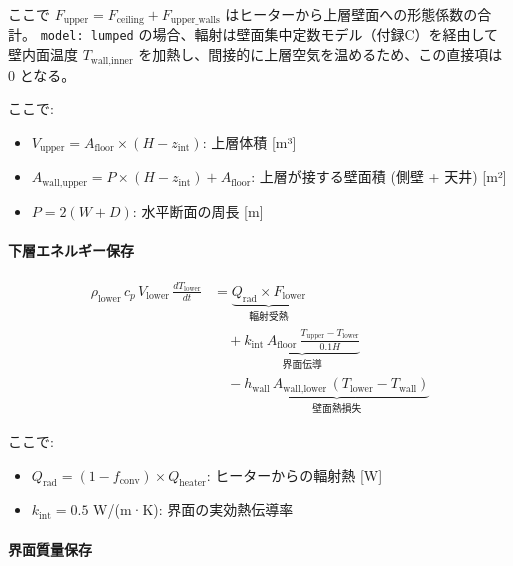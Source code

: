 \documentclass[a4paper,11pt]{article}
\begin{document}
ここで $F_{\text{upper}} = F_{\text{ceiling}} + F_{\text{upper\_walls}}$ はヒーターから上層壁面への形態係数の合計。
\texttt{model: lumped} の場合、輻射は壁面集中定数モデル（付録C）を経由して
壁内面温度 $T_{\text{wall,inner}}$ を加熱し、間接的に上層空気を温めるため、この直接項は 0 となる。

ここで:

\begin{itemize} \item $V_{\text{upper}} = A_{\text{floor}} \times (H - z_{\text{int}})$: 上層体積 [m³] \end{itemize}
\begin{itemize} \item $A_{\text{wall,upper}} = P \times (H - z_{\text{int}}) + A_{\text{floor}}$: 上層が接する壁面積 (側壁 + 天井) [m²] \end{itemize}
\begin{itemize} \item $P = 2(W + D)$: 水平断面の周長 [m] \end{itemize}

\paragraph{下層エネルギー保存}

\begin{align*}
\rho_{\text{lower}} \, c_p \, V_{\text{lower}} \, \frac{dT_{\text{lower}}}{dt}
&= \underbrace{Q_{\text{rad}} \times F_{\text{lower}}}_{\text{輻射受熱}} \\
&\quad + \underbrace{k_{\text{int}} \, A_{\text{floor}} \, \frac{T_{\text{upper}} - T_{\text{lower}}}{0.1 H}}_{\text{界面伝導}} \\
&\quad - \underbrace{h_{\text{wall}} \, A_{\text{wall,lower}} \, (T_{\text{lower}} - T_{\text{wall}})}_{\text{壁面熱損失}}
\end{align*}

ここで:

\begin{itemize} \item $Q_{\text{rad}} = (1 - f_{\text{conv}}) \times Q_{\text{heater}}$: ヒーターからの輻射熱 [W] \end{itemize}
\begin{itemize} \item $k_{\text{int}} = 0.5$ W/(m·K): 界面の実効熱伝導率 \end{itemize}

\paragraph{界面質量保存}
\end{document}
